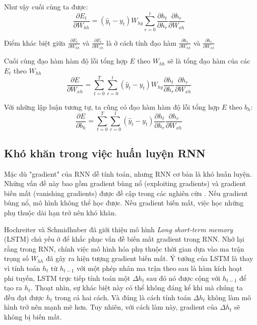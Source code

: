 Như vậy cuối cùng ta được:
\begin{equation} \label{gradientWRTSt18}
	\frac{\partial{E_t}}{\partial{W_{hh}}} = (\hat{y}_t - y_t) W_{hy} \sum_{r=0}^{t} \frac{\partial{h_t}}{\partial{h_r}} \frac{\partial{h_r}}{\partial{W_{xh}}}
\end{equation}

Điểm khác biệt giữa $\frac{\partial{E_t}}{\partial{W_{hh}}}$ và $\frac{\partial{E_t}}{\partial{W_{xh}}}$ là ở cách tính đạo hàm $\frac{\partial{h_r}}{\partial{W_{hh}}}$ và $\frac{\partial{h_r}}{\partial{W_{xh}}}$

Cuối cùng đạo hàm hàm độ lỗi tổng hợp $E$ theo $W_{hh}$ sẽ là tổng đạo hàm của các $E_t$ theo $W_{hh}$
\begin{equation} \label{gradientWRTSt19}
	\frac{\partial{E}}{\partial{W_{xh}}} = \sum_{t=0}^{T} \sum_{r=0}^{t} (\hat{y}_t - y_t) W_{hy}\frac{\partial{h_t}}{\partial{h_r}} \frac{\partial{h_r}}{\partial{W_{xh}}}
\end{equation}

Với những lập luận tương tự, ta cũng có đạo hàm hàm độ lỗi tổng hợp $E$ theo $b_h$:
\begin{equation} \label{gradientWRTSt20}
	\frac{\partial{E}}{\partial{b_h}} = \sum_{t=0}^{T} \sum_{r=0}^{t} (\hat{y}_t - y_t) \frac{\partial{h_t}}{\partial{h_r}} \frac{\partial{h_r}}{\partial{W_{xh}}}
\end{equation}

\subsection{Khó khăn trong việc huấn luyện RNN}

Mặc dù "gradient" của RNN dễ tính toán, nhưng RNN cơ bản là khó huấn luyện. Những vấn đề này bao gồm gradient bùng nổ (exploiting gradients) và gradient biến mất (vanishing gradients) được đề cập trong các nghiên cứu \cite{pascanu2011} \cite{hochreiter1997}. Nếu gradient bùng nổ, mô hình không thể học được. Nếu gradient biến mất, việc học những phụ thuộc dài hạn trở nên khó khăn.

Hochreiter và Schmidhuber \cite{hochreiter1997} đã giới thiệu mô hình \textit{Long short-term memory} (LSTM) chủ yếu ở để khắc phục vấn đề biến mất gradient trong RNN. Nhớ lại rằng trong RNN, chính việc mô hình hóa phụ thuộc thời gian dựa vào ma trận trọng số $W_{hh}$ đã gây ra hiện tượng gradient biến mất. Ý tưởng của LSTM là thay vì tính toán $h_t$ từ $h_{t-1}$ với một phép nhân ma trận theo sau là hàm kích hoạt phi tuyến, LSTM trực tiếp tính toán một $\Delta h_t$ sau đó nó được cộng với $h_{t-1}$ để tạo ra $h_t$. Thoạt nhìn, sự khác biệt này có thể không đáng kể khi mà chúng ta đều đạt được $h_t$ trong cả hai cách. Và đúng là cách tính toán $\Delta h_t$ không làm mô hình trở nên mạnh mẽ hơn. Tuy nhiên, với cách làm này, gradient của $\Delta h_t$ sẽ không bị biến mất.

